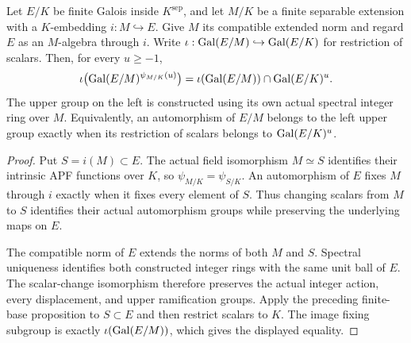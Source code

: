 \begin{lemma}
\label{fw:finite-tower-upper}
\leanok
Let $E/K$ be finite Galois inside $K^{\mathrm{sep}}$, and let $M/K$
be a finite separable extension with a $K$-embedding $i:M\hookrightarrow E$.
Give $M$ its compatible extended norm and regard $E$ as an $M$-algebra
through $i$. Write $\iota:\operatorname{Gal}(E/M)\hookrightarrow\operatorname{Gal}(E/K)$ for
restriction of scalars. Then, for every $u\geq-1$,
\[
 \iota\bigl(\operatorname{Gal}(E/M)^{\psi_{M/K}(u)}\bigr)
   =\iota(\operatorname{Gal}(E/M))\cap\operatorname{Gal}(E/K)^u.
\]
The upper group on the left is constructed using its own actual
spectral integer ring over $M$. Equivalently, an automorphism of $E/M$
belongs to the left upper group exactly when its restriction of scalars
belongs to $\operatorname{Gal}(E/K)^u$.
\end{lemma}
\begin{proof}
Put $S=i(M)\subset E$. The actual field isomorphism $M\simeq S$
identifies their intrinsic APF functions over $K$, so
$\psi_{M/K}=\psi_{S/K}$. An automorphism of $E$ fixes $M$ through
$i$ exactly when it fixes every element of $S$. Thus changing scalars
from $M$ to $S$ identifies their actual automorphism groups while
preserving the underlying maps on $E$.

The compatible norm of $E$ extends the norms of both $M$ and $S$.
Spectral uniqueness identifies both constructed integer rings with the
same unit ball of $E$. The scalar-change isomorphism therefore preserves
the actual integer action, every displacement, and upper ramification
groups. Apply the preceding finite-base proposition to $S\subset E$
and then restrict scalars to $K$. The image fixing subgroup is exactly
$\iota(\operatorname{Gal}(E/M))$, which gives the displayed equality.
\end{proof}

